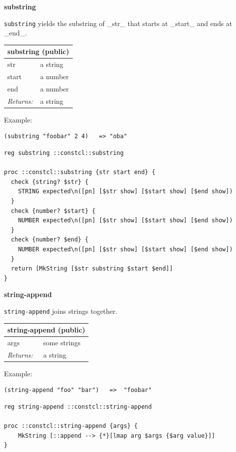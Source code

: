 \documentclass[twoside,9pt]{report}
\begin{document}
\textbf{substring}


\texttt{substring} yields the substring of \_str\_ that starts at \_start\_ and ends at \_end\_.

\begin{tabular}{ |l l| }
\hline
\multicolumn{2}{|l|}{substring (public)} \\
\hline
str & a string \\
start & a number \\
end & a number \\
\textit{Returns:} & a string \\
\hline
\end{tabular}


Example:

\noindent\makebox[\linewidth]{\rule{\linewidth}{0.4pt}}
\begin{lstlisting}
(substring "foobar" 2 4)   => "oba"
\end{lstlisting}
\noindent\makebox[\linewidth]{\rule{\linewidth}{0.4pt}}
\noindent\makebox[\linewidth]{\rule{\linewidth}{0.4pt}}
\begin{lstlisting}
reg substring ::constcl::substring
 
proc ::constcl::substring {str start end} {
  check {string? $str} {
    STRING expected\n([pn] [$str show] [$start show] [$end show])
  }
  check {number? $start} {
    NUMBER expected\n([pn] [$str show] [$start show] [$end show])
  }
  check {number? $end} {
    NUMBER expected\n([pn] [$str show] [$start show] [$end show])
  }
  return [MkString [$str substring $start $end]]
}
\end{lstlisting}
\noindent\makebox[\linewidth]{\rule{\linewidth}{0.4pt}}

\textbf{string-append}


\texttt{string-append} joins strings together.

\begin{tabular}{ |l l| }
\hline
\multicolumn{2}{|l|}{string-append (public)} \\
\hline
args & some strings \\
\textit{Returns:} & a string \\
\hline
\end{tabular}


Example:

\noindent\makebox[\linewidth]{\rule{\linewidth}{0.4pt}}
\begin{lstlisting}
(string-append "foo" "bar")   =>  "foobar"
\end{lstlisting}
\noindent\makebox[\linewidth]{\rule{\linewidth}{0.4pt}}
\noindent\makebox[\linewidth]{\rule{\linewidth}{0.4pt}}
\begin{lstlisting}
reg string-append ::constcl::string-append
 
proc ::constcl::string-append {args} {
    MkString [::append --> {*}[lmap arg $args {$arg value}]]
}
\end{lstlisting}
\noindent\makebox[\linewidth]{\rule{\linewidth}{0.4pt}}
\end{document}

